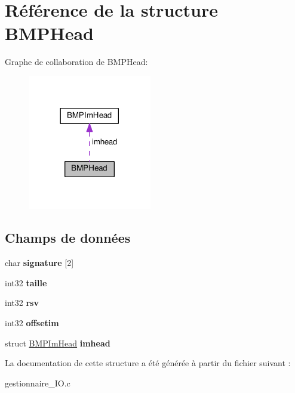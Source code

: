 \hypertarget{structBMPHead}{}\section{Référence de la structure B\+M\+P\+Head}
\label{structBMPHead}


Graphe de collaboration de B\+M\+P\+Head\+:\nopagebreak
\begin{figure}[H]
\begin{center}
\leavevmode
\includegraphics[width=153pt]{structBMPHead__coll__graph}
\end{center}
\end{figure}
\subsection*{Champs de données}
\begin{DoxyCompactItemize}
\item 
char {\bfseries signature} \mbox{[}2\mbox{]}\hypertarget{structBMPHead_afae656413fe7c6d5c726dcb859003a35}{}\label{structBMPHead_afae656413fe7c6d5c726dcb859003a35}

\item 
int32 {\bfseries taille}\hypertarget{structBMPHead_a129bb82110980f670597d789823f82b4}{}\label{structBMPHead_a129bb82110980f670597d789823f82b4}

\item 
int32 {\bfseries rsv}\hypertarget{structBMPHead_a7b05c13d2a23c9c98854d2ec5249b2d1}{}\label{structBMPHead_a7b05c13d2a23c9c98854d2ec5249b2d1}

\item 
int32 {\bfseries offsetim}\hypertarget{structBMPHead_aadcf34ce8edd039b3314fda48db52a41}{}\label{structBMPHead_aadcf34ce8edd039b3314fda48db52a41}

\item 
struct \hyperlink{structBMPImHead}{B\+M\+P\+Im\+Head} {\bfseries imhead}\hypertarget{structBMPHead_a4a8c172b2b1c554ef3af69e2a80c95d0}{}\label{structBMPHead_a4a8c172b2b1c554ef3af69e2a80c95d0}

\end{DoxyCompactItemize}


La documentation de cette structure a été générée à partir du fichier suivant \+:\begin{DoxyCompactItemize}
\item 
gestionnaire\+\_\+\+I\+O.\+c\end{DoxyCompactItemize}
